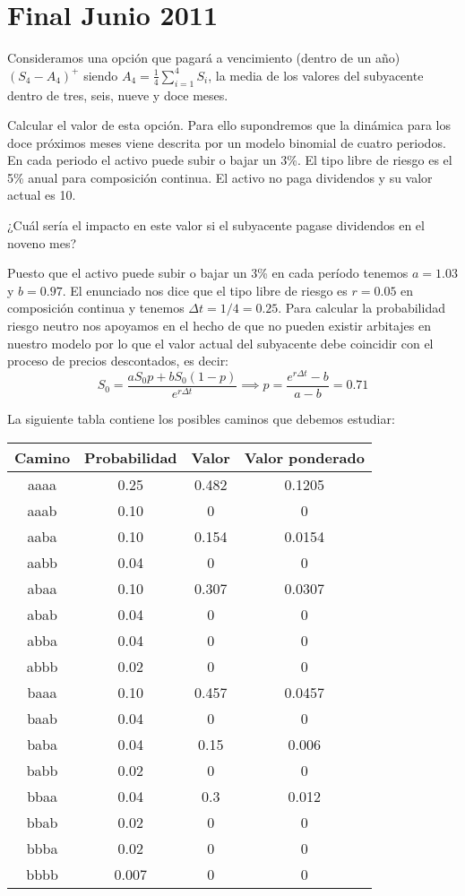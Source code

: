 \section{Final Junio 2011}
\begin{problem}[1]
Consideramos una opción que pagará a vencimiento (dentro de un año) $(S_4-A_4)^+$ siendo $A_4=\frac{1}{4}\sum_{i=1}^4S_i$, la media de los valores del subyacente dentro de tres, seis, nueve y doce meses.

\ppart Calcular el valor de esta opción. Para ello supondremos que la dinámica para los doce próximos meses viene descrita por un modelo binomial de cuatro periodos. En cada periodo el activo puede subir o bajar un 3\%. El tipo libre de riesgo es el 5\% anual para composición continua. El activo no paga dividendos y su valor actual es 10.

\ppart ¿Cuál sería el impacto en este valor si el subyacente pagase dividendos en el noveno mes?

\solution
{}

\spart

Puesto que el activo puede subir o bajar un 3\% en cada período tenemos $a=1.03$ y $b=0.97$. El enunciado nos dice que el tipo libre de riesgo es $r=0.05$ en composición continua y tenemos $Δt=1/4=0.25$. Para calcular la probabilidad riesgo neutro nos apoyamos en el hecho de que no pueden existir arbitajes en nuestro modelo por lo que el valor actual del subyacente debe coincidir con el proceso de precios descontados, es decir:
\[S_0 = \frac{aS_0p + bS_0(1-p)}{e^{rΔt}} \implies p = \frac{e^{rΔt}-b}{a-b} = 0.71\]

La siguiente tabla contiene los posibles caminos que debemos estudiar:

\begin{center}
\begin{tabular}{|c|c|c|c|}
\hline
\textbf{Camino} & \textbf{Probabilidad} & \textbf{Valor} & \textbf{Valor ponderado}\\
\hline
aaaa & 0.25  & 0.482 & 0.1205 \\
aaab & 0.10  & 0 & 0 \\
aaba & 0.10  & 0.154 & 0.0154 \\
aabb & 0.04  & 0     & 0 \\
abaa & 0.10  & 0.307 & 0.0307 \\
abab & 0.04  & 0     & 0 \\
abba & 0.04  & 0     & 0 \\
abbb & 0.02  & 0     & 0 \\
baaa & 0.10  & 0.457 & 0.0457 \\
baab & 0.04  & 0     & 0\\
baba & 0.04  & 0.15  & 0.006 \\
babb & 0.02  & 0     & 0 \\
bbaa & 0.04  & 0.3   & 0.012 \\
bbab & 0.02  & 0     & 0 \\
bbba & 0.02  & 0     & 0 \\
bbbb & 0.007 & 0     & 0 \\
\hline
\end{tabular}
\end{center}


\end{problem}
